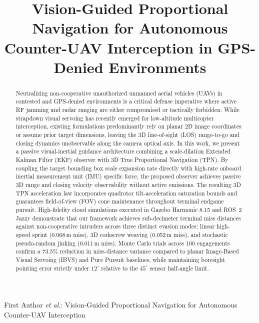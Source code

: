 \documentclass[lettersize,journal]{IEEEtran}
\begin{document}
\title{Vision-Guided Proportional Navigation for Autonomous Counter-UAV Interception in GPS-Denied Environments}

\author{
    \and
}

%
{First Author \MakeLowercase{\textit{et al.}}: Vision-Guided Proportional Navigation for Autonomous Counter-UAV Interception}

\maketitle

\begin{abstract}
Neutralizing non-cooperative unauthorized unmanned aerial vehicles (UAVs) in contested and GPS-denied environments is a critical defense imperative where active RF jamming and radar ranging are either compromised or tactically forbidden. While strapdown visual servoing has recently emerged for low-altitude multicopter interception, existing formulations predominantly rely on planar 2D image coordinates or assume prior target dimensions, leaving the 3D line-of-sight (LOS) range-to-go and closing dynamics unobservable along the camera optical axis. In this work, we present a passive visual-inertial guidance architecture combining a scale-dilation Extended Kalman Filter (EKF) observer with 3D True Proportional Navigation (TPN). By coupling the target bounding box scale expansion rate directly with high-rate onboard inertial measurement unit (IMU) specific force, the proposed observer achieves passive 3D range and closing velocity observability without active emissions. The resulting 3D TPN acceleration law incorporates quadrotor tilt-acceleration saturation bounds and guarantees field-of-view (FOV) cone maintenance throughout terminal endgame pursuit. High-fidelity cloud simulations executed in Gazebo Harmonic 8.15 and ROS~2 Jazzy demonstrate that our framework achieves sub-decimeter terminal miss distances against non-cooperative intruders across three distinct evasion modes: linear high-speed sprint (0.068\,m miss), 3D corkscrew weaving (0.052\,m miss), and stochastic pseudo-random jinking (0.011\,m miss). Monte Carlo trials across 100 engagements confirm a 73.5\% reduction in miss-distance variance compared to planar Image-Based Visual Servoing (IBVS) and Pure Pursuit baselines, while maintaining boresight pointing error strictly under $12^\circ$ relative to the $45^\circ$ sensor half-angle limit.
\end{abstract}
\end{document}
